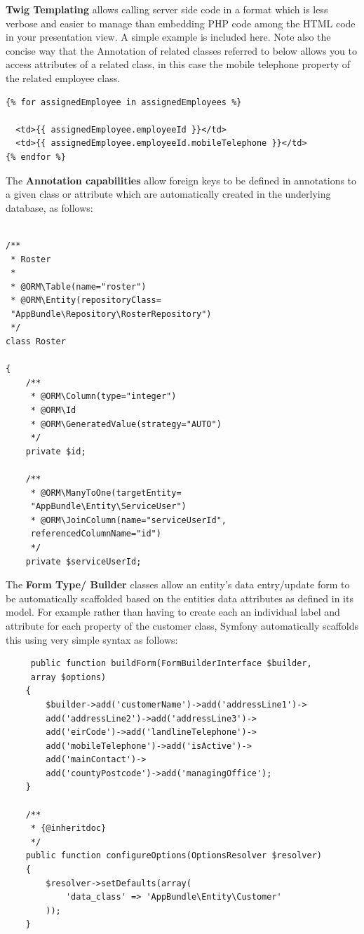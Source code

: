 \documentclass[a4paper,Times New Roman 11pt]{article}
\begin{document}
\textbf{Twig Templating }allows calling server side code in a format which is less verbose and easier to manage than embedding PHP code among the HTML code in your presentation view. A simple example is included here. Note also the concise way that the Annotation of related classes referred to below allows you to access attributes of a related class, in this case the mobile telephone property of the related employee class.

\begin{verbatim}
{% for assignedEmployee in assignedEmployees %}

  <td>{{ assignedEmployee.employeeId }}</td>
  <td>{{ assignedEmployee.employeeId.mobileTelephone }}</td>
{% endfor %}
\end{verbatim}
The \textbf{Annotation capabilities} allow foreign keys to be defined in annotations to a given class or attribute which are automatically created in the underlying database, as follows:

 \begin{verbatim}

/**
 * Roster
 *
 * @ORM\Table(name="roster")
 * @ORM\Entity(repositoryClass=
 "AppBundle\Repository\RosterRepository")
 */
class Roster

{
    /**
     * @ORM\Column(type="integer")
     * @ORM\Id
     * @ORM\GeneratedValue(strategy="AUTO")
     */
    private $id;

    /**
     * @ORM\ManyToOne(targetEntity=
     "AppBundle\Entity\ServiceUser")
     * @ORM\JoinColumn(name="serviceUserId", 
     referencedColumnName="id")
     */
    private $serviceUserId;
\end{verbatim}
 
The \textbf{Form Type/ Builder} classes allow an entity's data entry/update form to be automatically scaffolded based on the entities data attributes as defined in its model. For example rather than having to create each an individual label and attribute for each property of the customer class, Symfony automatically scaffolds this using very simple syntax as follows:
 
 \begin{verbatim}
     public function buildForm(FormBuilderInterface $builder, 
     array $options)
    {
        $builder->add('customerName')->add('addressLine1')->
        add('addressLine2')->add('addressLine3')->
        add('eirCode')->add('landlineTelephone')->
        add('mobileTelephone')->add('isActive')->
        add('mainContact')->
        add('countyPostcode')->add('managingOffice');
    }

    /**
     * {@inheritdoc}
     */
    public function configureOptions(OptionsResolver $resolver)
    {
        $resolver->setDefaults(array(
            'data_class' => 'AppBundle\Entity\Customer'
        ));
    }
    
\end{verbatim}
\end{document}
